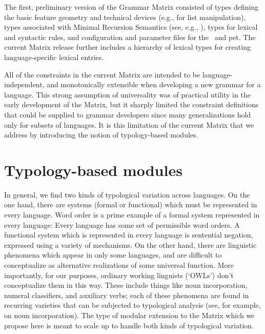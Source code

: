 The first, preliminary version of the Grammar Matrix 
consisted of types defining the basic feature geometry and technical
devices (e.g., for list manipulation), types associated with Minimal
Recursion Semantics (see, e.g., \cite{Cop:Las:Fli:01}), types for
lexical and syntactic rules, and configuration and parameter
files for the \lkb\ and {\sc pet}.  The current Matrix release further 
includes a hierarchy of lexical types for creating language-specific 
lexical entries.

All of the constraints in the current Matrix are intended to be 
language-independent, and monotonically extensible when developing a
new grammar for a language.
This strong 
assumption of universality was of practical utility in the early
development of the Matrix, but it sharply limited the 
constraint definitions that could be supplied to grammar developers
since many generalizations hold only for subsets of languages.  It is
this limitation of the current Matrix that we address by introducing
the notion of typology-based modules.

\section{Typology-based modules}

In general, we find two kinds of typological variation across
languages.  On the one hand, there are systems (formal or functional)
which must be represented in every language.  Word order is a prime
example of a formal system represented in every language: Every
language has some set of permissible word orders.
A functional system which is represented in every language is
sentential negation, expressed using a variety of mechanisms.  On 
the other hand, there are linguistic
phenomena which appear in only some languages, and are difficult to
conceptualize as alternative realizations of some universal function.  More
importantly, for our purposes, ordinary working linguists (`OWLs')
don't conceptualize them in this way.  These include things like
noun incorporation, numeral classifiers, and auxiliary verbs; each of
these phenomena are found in recurring varieties that can be 
subjected to typological
analysis (see, for example, \cite{Mithun:84} on noun incorporation).
The type of modular extension to the Matrix which we propose here
is meant to scale up to handle both kinds of typological variation.

